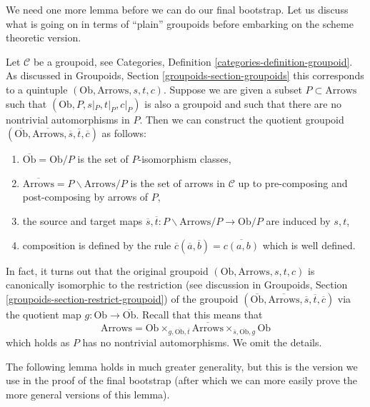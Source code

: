 \noindent
We need one more lemma before we can do our final bootstrap.
Let us discuss what is going on in terms of ``plain'' groupoids before
embarking on the scheme theoretic version.

\medskip\noindent
Let $\mathcal{C}$ be a groupoid, see
Categories, Definition \ref{categories-definition-groupoid}.
As discussed in
Groupoids, Section \ref{groupoids-section-groupoids}
this corresponds to a quintuple $(\text{Ob}, \text{Arrows}, s, t, c)$.
Suppose we are given a subset $P \subset \text{Arrows}$ such that
$(\text{Ob}, P, s|_P, t|_P, c|_P)$ is also a groupoid and such
that there are no nontrivial automorphisms in $P$. Then we can construct
the quotient groupoid
$(\overline{\text{Ob}}, \overline{\text{Arrows}}, \overline{s},
\overline{t}, \overline{c})$
as follows:
\begin{enumerate}
\item $\overline{\text{Ob}} = \text{Ob}/P$
is the set of $P$-isomorphism classes,
\item $\overline{\text{Arrows}} = P\backslash \text{Arrows}/P$
is the set of arrows in $\mathcal{C}$ up to pre-composing and
post-composing by arrows of $P$,
\item the source and target maps
$\overline{s}, \overline{t} : P\backslash \text{Arrows}/P \to \text{Ob}/P$
are induced by $s, t$,
\item composition is defined by the rule
$\overline{c}(\overline{a}, \overline{b}) = \overline{c(a, b)}$
which is well defined.
\end{enumerate}
In fact, it turns out that the original groupoid
$(\text{Ob}, \text{Arrows}, s, t, c)$ is canonically
isomorphic to the restriction (see discussion in
Groupoids, Section \ref{groupoids-section-restrict-groupoid})
of the groupoid
$(\overline{\text{Ob}}, \overline{\text{Arrows}}, \overline{s},
\overline{t}, \overline{c})$ via the quotient map
$g : \text{Ob} \to \overline{\text{Ob}}$. Recall that this means
that
$$
\text{Arrows} =
\text{Ob}
\times_{g, \overline{\text{Ob}}, \overline{t}}
\overline{\text{Arrows}}
\times_{\overline{s}, \overline{\text{Ob}}, g}
\text{Ob}
$$
which holds as $P$ has no nontrivial automorphisms.
We omit the details.

\medskip\noindent
The following lemma holds in much greater generality, but this is
the version we use in the proof of the final bootstrap (after which
we can more easily prove the more general versions of this lemma).

